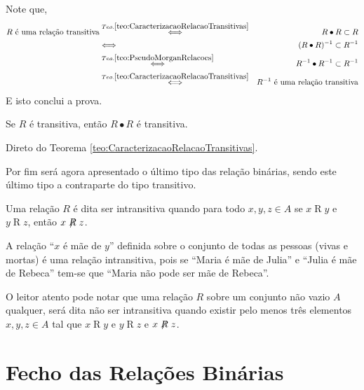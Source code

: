 \begin{prova}
	Note que,
	\begin{eqnarray*}
		R \text{ é uma relação transitiva} & \stackrel{Teo. \ref{teo:CaracterizacaoRelacaoTransitivas}}{\Longleftrightarrow }& R \bullet R \subset R\\
		& \stackrel{ }{\Longleftrightarrow} & (R \bullet R)^{-1} \subset R^{-1}\\
		& \stackrel{Teo. \ref{teo:PseudoMorganRelacoes}}{\Longleftrightarrow} & R^{-1} \bullet R^{-1} \subset R^{-1}\\
		&  \stackrel{Teo. \ref{teo:CaracterizacaoRelacaoTransitivas}}{\Longleftrightarrow } & R^{-1} \text{ é uma relação transitiva}
	\end{eqnarray*}
	E isto conclui a prova.
\end{prova}

\begin{teorema}
	Se $R$ é transitiva, então $R \bullet R$ é transitiva.
\end{teorema}

\begin{prova}
	Direto do Teorema \ref{teo:CaracterizacaoRelacaoTransitivas}.
\end{prova}

Por fim será agora apresentado o último tipo das relação binárias, sendo este último tipo a contraparte do tipo transitivo.

\begin{definicao}\label{def::RelacaoIntransitiva}
	Uma relação $R$ é dita ser intransitiva quando para todo $x, y, z \in A$ se $x \mathrel{R} y$ e $y \mathrel{R} z$, então $x \centernot{R} z$.
\end{definicao}

\begin{exemplo}
	A relação ``$x$ é mãe de $y$'' definida sobre o conjunto de todas as pessoas (vivas e mortas) é uma relação intransitiva, pois se ``Maria é mãe de Julia'' e ``Julia é mãe de Rebeca'' tem-se que ``Maria não pode ser mãe de Rebeca''.
\end{exemplo}

O leitor atento pode notar que uma relação $R$ sobre um conjunto não vazio $A$ qualquer, será dita não ser intransitiva quando existir pelo menos três elementos $x, y, z \in A$ tal que $x \mathrel{R} y$ e $y \mathrel{R} z$ e $x \centernot{R} z$.

\section{Fecho das Relações Binárias}\label{sec:FechoDasRelacoesBinarias}

